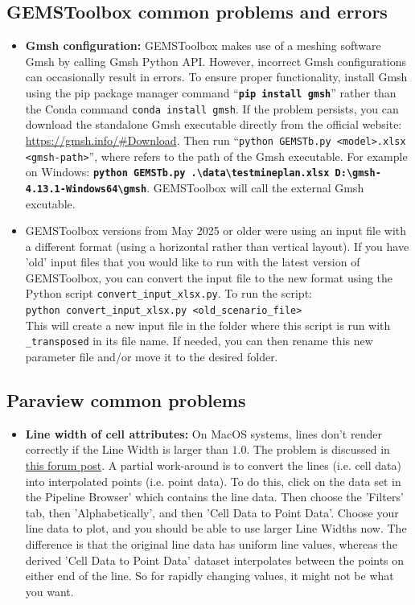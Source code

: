 \subsection{GEMSToolbox common problems and errors}
\begin{itemize}
      \item \textbf{Gmsh configuration:} GEMSToolbox makes use of a meshing software Gmsh by calling Gmsh Python API. However, incorrect Gmsh configurations can occasionally result in errors. To ensure proper functionality, install Gmsh using the pip package manager command ``{\tt \bf pip install gmsh}'' rather than the Conda command {\tt conda install gmsh}. If the problem persists, you can download the standalone Gmsh executable directly from the official website: \url{https://gmsh.info/#Download}. Then run ``{\tt python GEMSTb.py <model>.xlsx <gmsh-path>}'', where {\tt <gmsh-path>}  refers to the path of the Gmsh executable. For example on Windows: {\tt \bf python GEMSTb.py .\textbackslash data\textbackslash testmineplan.xlsx D:\textbackslash gmsh-4.13.1-Windows64\textbackslash gmsh}. GEMSToolbox will call the external Gmsh excutable.
      \item GEMSToolbox versions from May 2025 or older were using an input file with a different format (using a horizontal rather than vertical layout). If you have 'old' input files that you would like to run with the latest version of GEMSToolbox, you can convert the input file to the new format using the Python script {\tt convert\_input\_xlsx.py}.
      To run the script: \\
      {\tt python convert\_input\_xlsx.py <old\_scenario\_file>}\\
      This will create a new input file in the folder where this script is run with {\tt \_transposed} in its file name. If needed, you can then rename this new parameter file and/or move it to the desired folder.
\end{itemize}

\subsection{Paraview common problems}
\begin{itemize}
      \item \textbf{Line width of cell attributes:} On MacOS systems, lines don't render correctly if the Line Width is larger than $1.0$. The problem is discussed in \href{https://discourse.paraview.org/t/cell-values-partly-disappear-when-editing-width-on-mac/11666}{this forum post}. A partial work-around is to convert the lines (i.e. cell data) into interpolated points (i.e. point data). To do this, click on the data set in the Pipeline Browser' which contains the line data. Then choose the 'Filters' tab, then 'Alphabetically', and then 'Cell Data to Point Data'. Choose your line data to plot, and you should be able to use larger Line Widths now. The difference is that the original line data has uniform line values, whereas the derived 'Cell Data to Point Data' dataset interpolates between the points on either end of the line. So for rapidly changing values, it might not be what you want. 
\end{itemize}


